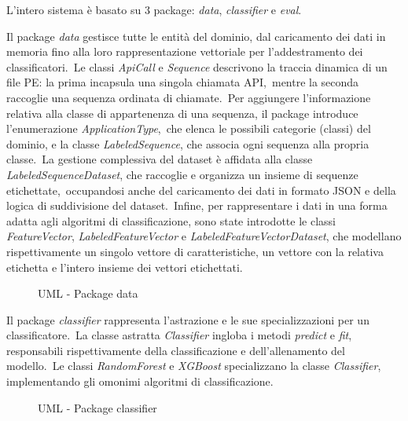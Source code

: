 \FloatBarrier

L'intero sistema è basato su $3$ package: \textit{data}, \textit{classifier} e \textit{eval}.

Il package \textit{data} gestisce tutte le entità del dominio, dal caricamento dei dati in memoria fino alla loro rappresentazione vettoriale per l'addestramento dei classificatori.\
Le classi \textit{ApiCall} e \textit{Sequence} descrivono la traccia dinamica di un file PE: la prima incapsula una singola chiamata API,\
mentre la seconda raccoglie una sequenza ordinata di chiamate.\
Per aggiungere l'informazione relativa alla classe di appartenenza di una sequenza, il package introduce l'enumerazione \textit{ApplicationType},\
che elenca le possibili categorie (classi) del dominio, e la classe \textit{LabeledSequence}, che associa ogni sequenza alla propria classe.\
La gestione complessiva del dataset è affidata alla classe \textit{LabeledSequenceDataset}, che raccoglie e organizza un insieme di sequenze etichettate,\
occupandosi anche del caricamento dei dati in formato JSON e della logica di suddivisione del dataset.\
Infine, per rappresentare i dati in una forma adatta agli algoritmi di classificazione, sono state introdotte le classi \textit{FeatureVector}, \textit{LabeledFeatureVector} e \textit{LabeledFeatureVectorDataset},
che modellano rispettivamente un singolo vettore di caratteristiche, un vettore con la relativa etichetta e l'intero insieme dei vettori etichettati.

\begin{figure}[htbp] %
    \centering
    \adjustbox{max width=\linewidth, max height=\textheight}{%
    }
    \caption{UML - Package data}
    \label{fig:pacakge-data}
\end{figure}

Il package \textit{classifier} rappresenta l'astrazione e le sue specializzazioni per un classificatore.\
La classe astratta \textit{Classifier} ingloba i metodi \textit{predict} e \textit{fit}, responsabili rispettivamente della classificazione e dell'allenamento del modello.\
Le classi \textit{RandomForest} e \textit{XGBoost} specializzano la classe \textit{Classifier}, implementando gli omonimi algoritmi di classificazione.

\begin{figure}[htbp] %
    \centering
    \adjustbox{max width=\linewidth, max height=\textheight}{%
    }
    \caption{UML - Package classifier}
    \label{fig:pacakge-classifier}
\end{figure}

